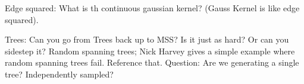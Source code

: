 Edge squared: What is th continuous gaussian kernel? (Gauss Kernel is
    like edge squared).

Trees: Can you go from Trees back up to MSS? Is it just as hard? Or can
you sidestep it?
Random spanning trees; Nick Harvey gives a simple example where random
spanning trees fail. Reference that. Question: Are we generating a
single tree? Independently sampled?

